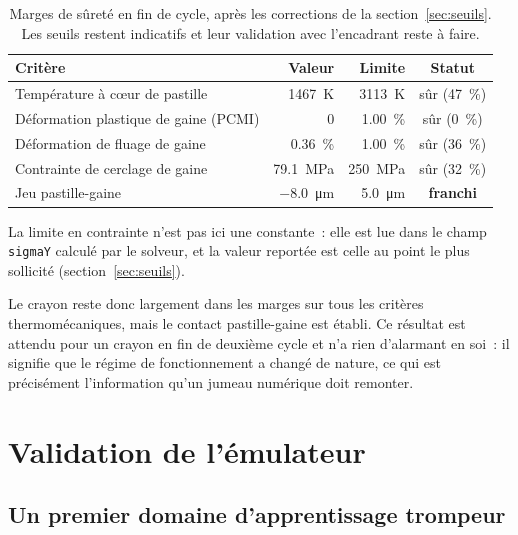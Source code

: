 \documentclass[12pt,a4paper,french]{report}
\begin{document}
\begin{table}[htbp]
\centering
\caption[Marges de sûreté en fin de cycle]{Marges de sûreté en fin de cycle, après les corrections de la
section~\ref{sec:seuils}. Les seuils restent indicatifs et leur validation
avec l'encadrant reste à faire.}
\label{tab:marges}
\begin{tabularx}{0.95\textwidth}{@{}Xrrc@{}}
\toprule
\textbf{Critère} & \textbf{Valeur} & \textbf{Limite} & \textbf{Statut}\\
\midrule
Température à c\oe ur de pastille & \SI{1467}{\kelvin} & \SI{3113}{\kelvin}
  & sûr (\SI{47}{\percent})\\
Déformation plastique de gaine (PCMI) & \num{0} &
  \SI{1.00}{\percent} & sûr (\SI{0}{\percent})\\
Déformation de fluage de gaine & \SI{0.36}{\percent} &
  \SI{1.00}{\percent} & sûr (\SI{36}{\percent})\\
Contrainte de cerclage de gaine & \SI{79.1}{\mega\pascal} &
  \SI{250}{\mega\pascal} & sûr (\SI{32}{\percent})\\
Jeu pastille-gaine & \SI{-8.0}{\micro\metre} & \SI{5.0}{\micro\metre}
  & \textcolor{cAlert}{\textbf{franchi}}\\
\bottomrule
\end{tabularx}
\end{table}

\noindent
La limite en contrainte n'est pas ici une constante~: elle est lue dans le champ
\texttt{sigmaY} calculé par le solveur, et la valeur reportée est celle au point
le plus sollicité (section~\ref{sec:seuils}).

Le crayon reste donc largement dans les marges sur tous les critères
thermomécaniques, mais le contact pastille-gaine est établi. Ce résultat est
attendu pour un crayon en fin de deuxième cycle et n'a rien d'alarmant en soi~:
il signifie que le régime de fonctionnement a changé de nature, ce qui est
précisément l'information qu'un jumeau numérique doit remonter.

\section{Validation de l'émulateur}
\label{sec:validation-emulateur}

\subsection{Un premier domaine d'apprentissage trompeur}
\end{document}
